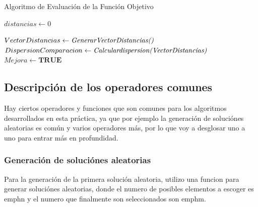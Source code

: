 \documentclass{article}
\begin{document}
\begin{algorithm}
  \scriptsize
  \label{Algoritmo de Evaluacion de la Funcion Objetivo}
  \caption{Algoritmo de Evaluación de la Función Objetivo}
  $distancias \leftarrow 0$\\
  
\vspace{3mm}

\vspace{3mm}
$Vector Distancias \leftarrow{\emph{GenerarVectorDistancias()}}$\\
$Dispersion Comparacion \leftarrow{\emph{Calculardispersion(VectorDistancias)}}$\\
\vspace{3mm}
$Mejora \leftarrow {\textbf{TRUE}}$\\

\end{algorithm}

\subsection{\normalsize Descripción de los operadores comunes}
Hay ciertos operadores y funciones que son comunes para los algoritmos desarrollados en esta práctica,
ya que por ejemplo la generación de soluciónes aleatorias es común y varios operadores 
más, por lo que voy a desglosar uno a uno para entrar más en profundidad.

\vspace{3mm}

\subsubsection{\small Generación de soluciónes aleatorias}
Para la generación de la primera solución aleatoria, utilizo una funcion para generar soluciónes 
aleatorias, donde el numero de posibles elementos a escoger es emph{n} y el numero que finalmente son seleccionados 
son emph{m}.
\end{document}
